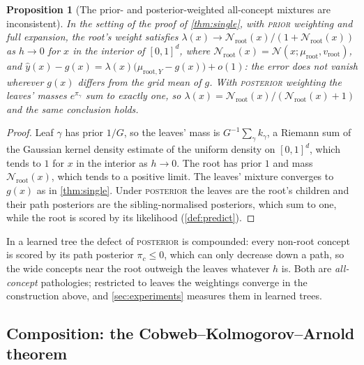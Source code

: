 \documentclass[11pt]{article}
\newtheorem{proposition}[theorem]{Proposition}
\theoremstyle{definition}
\theoremstyle{remark}
\newcommand{\N}{\mathcal{N}}
\newcommand{\hy}{\hat{y}}
\begin{document}
\begin{proposition}[The prior- and posterior-weighted all-concept mixtures are inconsistent]\label{prop:prior}
In the setting of the proof of \cref{thm:single}, with \textsc{prior} weighting and full
expansion, the root's weight satisfies
$\lambda(x)\to\N_{\text{root}}(x)/(1+\N_{\text{root}}(x))$ as $h\to0$ for $x$ in the interior
of $[0,1]^d$, where $\N_{\text{root}}(x)=\N(x;\mu_{\text{root}},v_{\text{root}})$, and $\hy(x)-g(x)=\lambda(x)\bigl(\mu_{\text{root},Y}-g(x)\bigr)+o(1)$: the
error does not vanish wherever $g(x)$ differs from the grid mean of $g$.  With
\textsc{posterior} weighting the leaves' masses $e^{\pi_\gamma}$ sum to exactly one, so
$\lambda(x)=\N_{\text{root}}(x)/(\N_{\text{root}}(x)+1)$ and the same conclusion holds.
\end{proposition}
\begin{proof}
Leaf $\gamma$ has prior $1/G$, so the leaves' mass is $G^{-1}\sum_\gamma k_\gamma$, a
Riemann sum of the Gaussian kernel density estimate of the uniform density on $[0,1]^d$,
which tends to $1$ for $x$ in the interior as $h\to0$.  The root has prior $1$ and mass $\N_{\text{root}}(x)$, which tends to a positive limit.
The leaves' mixture converges to $g(x)$ as in \cref{thm:single}.  Under \textsc{posterior}
the leaves are the root's children and their path posteriors are the sibling-normalised
posteriors, which sum to one, while the root is scored by its likelihood
(\cref{def:predict}).
\end{proof}

In a learned tree the defect of \textsc{posterior} is compounded: every non-root concept
is scored by its path posterior $\pi_c\le0$, which can only decrease down a path, so the
wide concepts near the root outweigh the leaves whatever $h$ is.  Both are
\emph{all-concept} pathologies; restricted to leaves the weightings converge in the
construction above, and \cref{sec:experiments} measures them in learned trees.

\subsection{Composition: the Cobweb--Kolmogorov--Arnold theorem}
\end{document}
